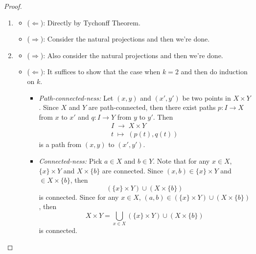\begin{proof}
    \begin{enumerate}
        \item \begin{itemize}
            \item ($\Leftarrow$): Directly by Tychonff Theorem.
            \item ($\Rightarrow$): Consider the natural projections and then we're done.
        \end{itemize}
        \item \begin{itemize}
            \item ($\Rightarrow$): Also consider the natural projections and then we're done.
            \item ($\Leftarrow$): It suffices to show that the case when $k=2$ and then do induction on $k$.
            \begin{itemize}
                \item \textit{Path-connected-ness:} Let $(x,y)$ and $(x',y')$ be two points in $X \times Y$. Since $X$ and $Y$ are path-connected, then there exist paths $p: I \to X$ from $x$ to $x'$ and $q: I \to Y$ from $y$ to $y'$. Then
                $$\substack{I \;\to\; X \times Y\\
                t \;\mapsto\; (p(t),q(t)) }$$
                is a path from $(x,y)$ to $(x',y')$.

                \item \textit{Connected-ness:} Pick $a \in X$ and $b \in Y$. Note that for any $x \in X$, $\{x\} \times Y$ and $X \times \{b\}$ are connected. Since $(x,b) \in \{x\} \times Y$ and $\in X\times \{b\}$, then
                $$(\{x\} \times Y) \cup (X \times \{b\})$$
                is connected. Since for any $x \in X$, $(a,b) \in  (\{x\} \times Y) \cup (X \times \{b\})$, then
                $$X\times Y = \bigcup_{x \in X} (\{x\} \times Y) \cup (X \times \{b\})$$
                is connected.
            \end{itemize}
        \end{itemize}


\end{enumerate}
\end{proof}
